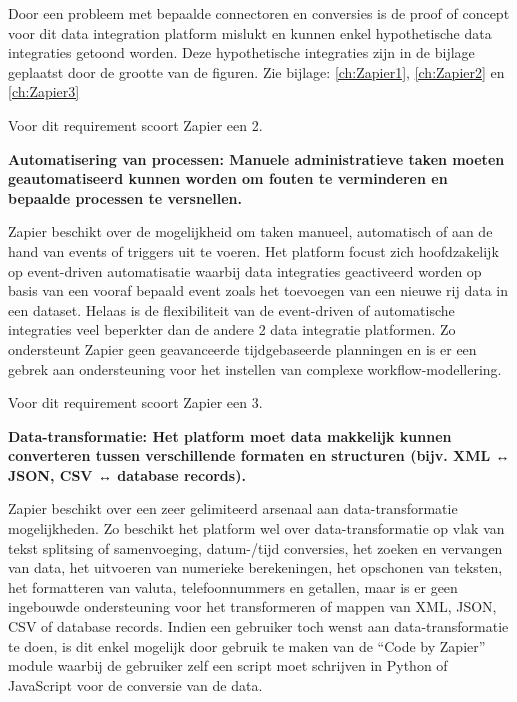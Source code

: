 \vspace{\baselineskip}

Door een probleem met bepaalde connectoren en conversies is de proof of concept voor dit data integration platform mislukt en kunnen enkel hypothetische data integraties getoond worden. Deze hypothetische integraties zijn in de bijlage geplaatst door de grootte van de figuren. Zie bijlage: \ref{ch:Zapier1}, \ref{ch:Zapier2} en \ref{ch:Zapier3}

Voor dit requirement scoort Zapier een 2.


\vspace{\baselineskip}

\textbf{Automatisering van processen: Manuele administratieve taken moeten geautomatiseerd kunnen worden om fouten te verminderen en bepaalde processen te versnellen.}

\vspace{\baselineskip}

Zapier beschikt over de mogelijkheid om taken manueel, automatisch of aan de hand van events of triggers uit te voeren. Het platform focust zich hoofdzakelijk op event-driven automatisatie waarbij data integraties geactiveerd worden op basis van een vooraf bepaald event zoals het toevoegen van een nieuwe rij data in een dataset. Helaas is de flexibiliteit van de event-driven of automatische integraties veel beperkter dan de andere 2 data integratie platformen. Zo ondersteunt Zapier geen geavanceerde tijdgebaseerde planningen en is er een gebrek aan ondersteuning voor het instellen van complexe workflow-modellering.


Voor dit requirement scoort Zapier een 3.

\vspace{\baselineskip}
\textbf{Data-transformatie: Het platform moet data makkelijk kunnen converteren tussen verschillende formaten en structuren (bijv. XML ↔ JSON, CSV ↔ database records).}

\vspace{\baselineskip}

Zapier beschikt over een zeer gelimiteerd arsenaal aan data-transformatie mogelijkheden. Zo beschikt het platform wel over data-transformatie op vlak van tekst splitsing of samenvoeging, datum-/tijd conversies, het zoeken en vervangen van data, het uitvoeren van numerieke berekeningen, het opschonen van teksten, het formatteren van valuta, telefoonnummers en getallen, maar is er geen ingebouwde ondersteuning voor het transformeren of mappen van XML, JSON, CSV of database records. Indien een gebruiker toch wenst aan data-transformatie te doen, is dit enkel mogelijk door gebruik te maken van de “Code by Zapier” module waarbij de gebruiker zelf een script moet schrijven in Python of JavaScript voor de conversie van de data.

